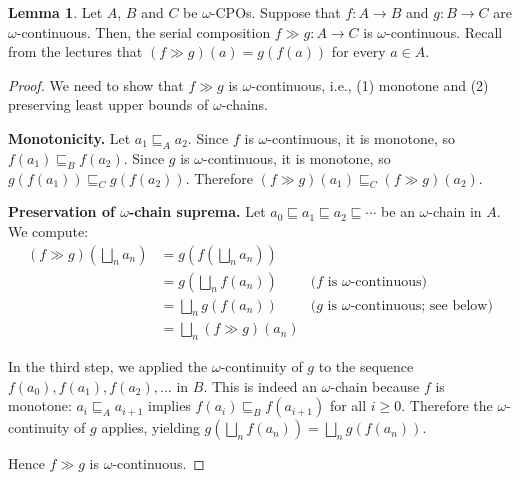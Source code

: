 \documentclass[11pt]{article}
\theoremstyle{definition}
\newtheorem{myLemma}[thm]{Lemma}{\bfseries}{}
\newcommand{\serial}{\gg}
\begin{document}
\begin{myLemma}
	Let $A$, $B$ and $C$ be $\omega$-CPOs. Suppose that $f: A \to B$ and $g: B \to C$ are $\omega$-continuous. Then, the serial composition $f \serial g: A \to C$ is $\omega$-continuous. Recall from the lectures that $(f \serial g)(a) = g(f(a))$ for every $a \in A$.
\end{myLemma}
\begin{proof}
	We need to show that $f \serial g$ is $\omega$-continuous, i.e., (1) monotone and (2) preserving least upper bounds of $\omega$-chains.

	\textbf{Monotonicity.} Let $a_1 \sqsubseteq_A a_2$. Since $f$ is $\omega$-continuous, it is monotone, so $f(a_1) \sqsubseteq_B f(a_2)$. Since $g$ is $\omega$-continuous, it is monotone, so $g(f(a_1)) \sqsubseteq_C g(f(a_2))$. Therefore $(f \serial g)(a_1) \sqsubseteq_C (f \serial g)(a_2)$.

	\textbf{Preservation of $\omega$-chain suprema.} Let $a_0 \sqsubseteq a_1 \sqsubseteq a_2 \sqsubseteq \cdots$ be an $\omega$-chain in $A$. We compute:
	\begin{align*}
		(f \serial g)\!\left(\bigsqcup_n a_n\right)
		 & = g\!\left(f\!\left(\bigsqcup_n a_n\right)\right)                                                  \\
		 & = g\!\left(\bigsqcup_n f(a_n)\right)              & \text{($f$ is $\omega$-continuous)}            \\
		 & = \bigsqcup_n g(f(a_n))                           & \text{($g$ is $\omega$-continuous; see below)} \\
		 & = \bigsqcup_n (f \serial g)(a_n)
	\end{align*}

	In the third step, we applied the $\omega$-continuity of $g$ to the sequence $f(a_0), f(a_1), f(a_2), \ldots$ in $B$. This is indeed an $\omega$-chain because $f$ is monotone: $a_i \sqsubseteq_A a_{i+1}$ implies $f(a_i) \sqsubseteq_B f(a_{i+1})$ for all $i \geq 0$. Therefore the $\omega$-continuity of $g$ applies, yielding $g\!\left(\bigsqcup_n f(a_n)\right) = \bigsqcup_n g(f(a_n))$.

	Hence $f \serial g$ is $\omega$-continuous.
\end{proof}
\end{document}
